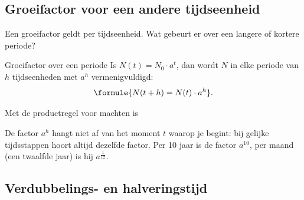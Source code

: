 \begin{oefeningen}
\end{oefeningen}

\subsection{Groeifactor voor een andere tijdseenheid}

Een groeifactor geldt per tijdseenheid. Wat gebeurt er over een langere of kortere periode?

\begin{theorie}
\begin{stelling}{Groeifactor over een periode}
Is $N(t) = N_0 \cdot a^t$, dan wordt $N$ in elke periode van $h$ tijdseenheden met $a^h$ vermenigvuldigd:
\[\formule{N(t + h) = N(t) \cdot a^h}.\]
\end{stelling}
\begin{bewijs}
Met de productregel voor machten is
\end{bewijs}
\end{theorie}

De factor $a^h$ hangt niet af van het moment $t$ waarop je begint: bij gelijke tijdsstappen hoort altijd dezelfde factor. Per 10 jaar is de factor $a^{10}$, per maand (een twaalfde jaar) is hij $a^{\frac{1}{12}}$.


\begin{oefeningen}
\end{oefeningen}

\subsection{Verdubbelings- en halveringstijd}

